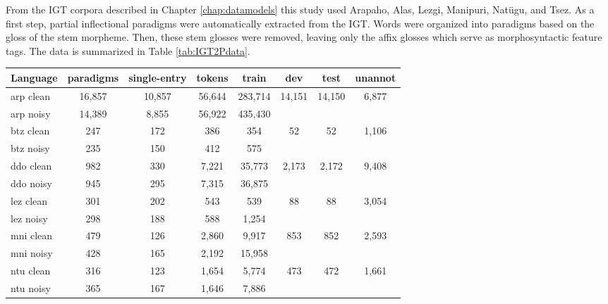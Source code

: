 From the IGT corpora described in Chapter \ref{chap:datamodels} this study used Arapaho, Alas, Lezgi, Manipuri, Nat\"ugu, and Tsez.
As a first step, partial inflectional paradigms were automatically extracted from the IGT. Words were organized into paradigms based on the gloss of the stem morpheme. Then, these stem glosses were removed, leaving only the affix glosses which serve as morphosyntactic feature tags. The data is summarized in Table \ref{tab:IGT2Pdata}.

\begin{table}[!tb]
    \centering
    \begin{tabular}{l|ccccccc}
       \textbf{Language} & \textbf{paradigms} & \textbf{single-entry} & \textbf{tokens} & \textbf{train} & \textbf{dev} & \textbf{test} & \textbf{unannot}  \\
       \hline
       arp clean & 16,857 & 10,857 & 56,644 & 283,714 & \multirow{2}{*}{14,151} & \multirow{2}{*}{14,150} & \multirow{2}{*}{6,877} \\
       arp noisy & 14,389 & 8,855 & 56,922 & 435,430 & & &  \\
       \hline
       btz clean & 247 & 172 & 386 & 354 & \multirow{2}{*}{52}  & \multirow{2}{*}{52} & \multirow{2}{*}{1,106} \\
       btz noisy & 235 & 150 & 412 & 575 & & & \\
       \hline
       ddo clean & 982 & 330 & 7,221 & 35,773 & \multirow{2}{*}{2,173} & \multirow{2}{*}{2,172} & \multirow{2}{*}{9,408} \\
       ddo noisy & 945 & 295 & 7,315 & 36,875 & & &  \\
       \hline
       lez clean & 301 & 202 & 543 & 539 & \multirow{2}{*}{88} & \multirow{2}{*}{88} & \multirow{2}{*}{3,054} \\
       lez noisy & 298 & 188 & 588 & 1,254 &  &  &  \\
       \hline
       mni clean & 479 & 126 & 2,860 & 9,917 & \multirow{2}{*}{853} & \multirow{2}{*}{852} & \multirow{2}{*}{2,593}\\
       mni noisy & 428 & 165 & 2,192 & 15,958 &  &  &  \\
       \hline
       ntu clean & 316 & 123 & 1,654 & 5,774 & \multirow{2}{*}{473} & \multirow{2}{*}{472} & \multirow{2}{*}{1,661} \\
       ntu noisy & 365 & 167 & 1,646 & 7,886 &  &  &  \\
     

\end{tabular}
\end{table}
